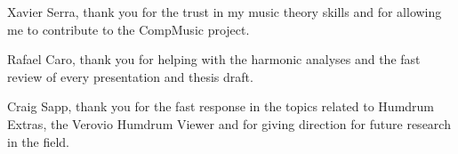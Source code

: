 
\begin{acknowledgement}

Xavier Serra, thank you for the trust in my music theory skills and for allowing me to contribute to the CompMusic project.

Rafael Caro, thank you for helping with the harmonic analyses and the fast review of every presentation and thesis draft.

Craig Sapp, thank you for the fast response in the topics related to Humdrum Extras, the Verovio Humdrum Viewer and for giving direction for future research in the field. 

\newpage
\end{acknowledgement}
